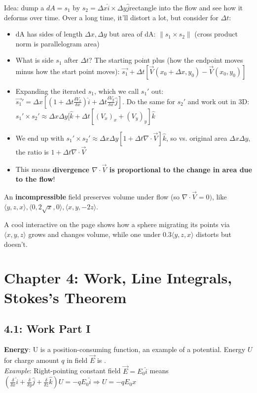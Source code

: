 \documentclass[11pt, oneside]{article}   	%
\begin{document}
Idea: dump a $dA=s_1$ by $s_2 =  \Delta x\hat{i} \times \Delta y\hat{j} $rectangle into the flow and see how it deforms over time.  Over a long time, it'll distort a lot, but consider for $\Delta t$:
\begin{itemize}
\item dA has sides of length $\Delta x, \Delta y$ but area of dA: $\| s_1 \times s_2\|$ (cross product norm is parallelogram area)
\item What is side $s_1$ after $\Delta t$? The starting point plus (how the endpoint moves minus how the start point moves): $\vec{s_1} + \Delta t[\vec{V}(x_0 + \Delta x, y_0) - \vec{V}(x_0, y_0)]$
\item Expanding the iterated $s_1$, which we call $s_1'$ out: $\vec{s_1}' = \Delta x[(1 + \Delta t\frac{\delta V_x}{\delta x})\hat{i} + \Delta t \frac{\delta V_y}{\delta x} \hat{j}]$.  Do the same for $s_2'$ and work out in 3D: $s_1' \times s_2' \approx \Delta x \Delta y [\hat{k} + \Delta t[(V_x)_x + (V_y)_y]\hat{k}$
\item We end up with $s_1' \times s_2' \approx \Delta x \Delta y [1 + \Delta t \nabla \cdot \vec{V}]\hat{k}$, so vs. original area $\Delta x \Delta y$, the ratio is $1 + \Delta t \nabla \cdot \vec{V}$
\item This means \textbf{divergence $\nabla \cdot \vec{V}$ is proportional to the change in area due to the flow}!
\end{itemize}

An \textbf{incompressible} field preserves volume under flow (so $\nabla \cdot \vec{V} = 0)$, like $\langle y, z, x\rangle, \langle 0, 2\sqrt{x}, 0 \rangle,  \langle x, y, -2z \rangle$.

A cool interactive on the page shows how a sphere migrating its points via $\langle x, y, z \rangle$ grows and changes volume, while one under $0.3 \langle  y, z , x \rangle$  distorts but doesn't.

\section{Chapter 4: Work, Line Integrals, Stokes's Theorem}
\subsection{4.1: Work Part I}

\textbf{Energy}: U is a position-consuming function, an example of a potential. Energy $U$ for charge amount $q$ in field $\vec{E}$ is .
\\
\emph{Example}: Right-pointing constant field $\vec{E} = E_0\hat{i}$ means $(\frac{\delta}{\delta x}\hat{i} + \frac{\delta}{\delta y}\hat{j} + \frac{\delta}{\delta z}\hat{k})U = -qE_0\hat{i} \Rightarrow U = -qE_0x$
\end{document}
